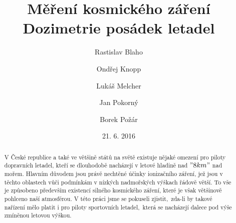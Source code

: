 \documentclass[11pt,a4paper]{article}
\begin{document}
\title{Měření kosmického záření\\Dozimetrie posádek letadel}
\author[1]{Rastislav Blaho}
\author[2]{Ondřej Knopp}
\author[3]{Lukáš Melcher}
\author[4]{Jan Pokorný}
\author[5]{Borek Požár}

\date{21. 6. 2016}

\maketitle

\thispagestyle{empty}

\begin{abstract}
V České republice a také ve většině států na světě existuje nějaké omezení pro
piloty dopravních letadel, kteří se dlouhodobě nacházejí v letové hladině nad
$"8 km"$ nad mořem. Hlavním důvodem jsou právě nechtěné účinky ionizačního
záření, jež jsou v těchto oblastech vůči podmínkám v nízkých nadmořských výškach
řádově větší. To vše je způsobeno především existencí silného kosmického
záření, které je však většinově pohlceno naší atmosférou. V této práci jsme se
pokuseli zjistit,~zda-li by takové nařízení mělo platit i pro piloty sportovních
letadel,~která se nacházejí dalece pod výše zmíněnou letovou výškou.
%

\end{abstract}
\end{document}
